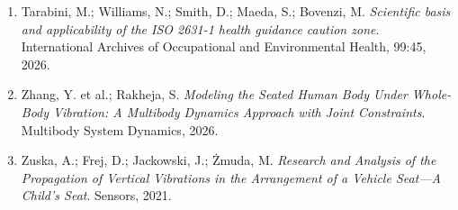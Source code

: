 \documentclass[11pt,a4paper]{article}
\begin{document}
\begin{enumerate}
{      Standard}. Applied Bionics and Biomechanics, 2022.
\item Tarabini, M.; Williams, N.; Smith, D.; Maeda, S.; Bovenzi, M.
      \emph{Scientific basis and applicability of the ISO 2631-1 health
      guidance caution zone}. International Archives of Occupational and
      Environmental Health, 99:45, 2026.
\item Zhang, Y. et al.; Rakheja, S. \emph{Modeling the Seated Human Body
      Under Whole-Body Vibration: A Multibody Dynamics Approach with Joint
      Constraints}. Multibody System Dynamics, 2026.
\item Zuska, A.; Frej, D.; Jackowski, J.; Żmuda, M. \emph{Research and
      Analysis of the Propagation of Vertical Vibrations in the Arrangement of
      a Vehicle Seat---A Child's Seat}. Sensors, 2021.
\end{enumerate}
\end{document}
